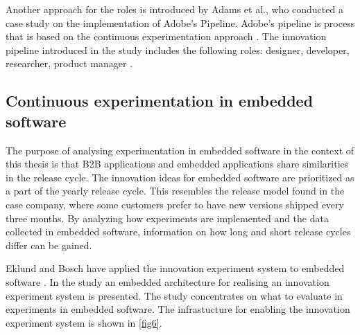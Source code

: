 \documentclass[english]{tktltiki2}
\theoremstyle{definition}
\theoremstyle{remark}
\begin{document}
Another approach for the roles is introduced by Adams et al., who conducted a case study on the implementation of Adobe's Pipeline. Adobe's pipeline is process that is based on the continuous experimentation approach \cite{adams2013creating, adobe}. The innovation pipeline introduced in the study includes the following roles: designer, developer, researcher, product manager \cite{adobe}.




\subsection{Continuous experimentation in embedded software}
The purpose of analysing experimentation in embedded software in the context of this thesis is that B2B applications and embedded applications share similarities in the release cycle. The innovation ideas for embedded software are prioritized as a part of the yearly release cycle. This resembles the release model found in the case company, where some customers prefer to have new versions shipped every three months. By analyzing how experiments are implemented and the data collected in embedded software, information on how long and short release cycles differ can be gained. 

Eklund and Bosch have applied the innovation experiment system to embedded software \cite{eklund2012architecture}. In the study an embedded architecture for realising an innovation experiment system is presented. The study concentrates on what to evaluate in experiments in embedded software. The infrastucture for enabling the innovation experiment system is shown in \ref{fig6}.
\end{document}
